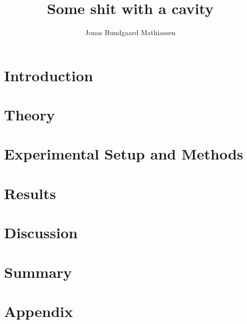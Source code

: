 \documentclass[a4paper,10pt]{memoir}
\author{Jonas Bundgaard Mathiassen}
\title{Some shit with a cavity}
\subtitle{}
\institute{Niels Bohr Institute}
\numberwithin{equation}{section}
\begin{document}
\maketitleMemoir

\newpage
\setcounter{page}{4}
\tableofcontents

\newpage
\section{Introduction}


\section{Theory}


\section{Experimental Setup and Methods}

\section{Results}

\section{Discussion}


\section{Summary}
\newpage

\section{Appendix}
\end{document}
